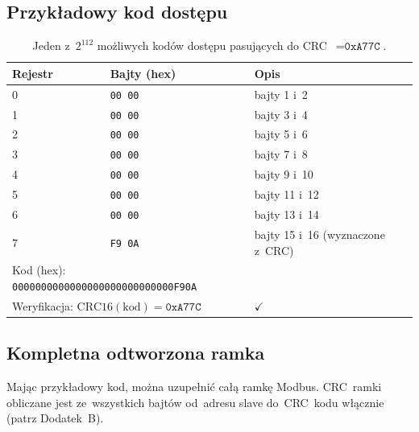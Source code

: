 \documentclass[12pt,a4paper]{article}
\begin{document}
\subsection*{Przykładowy kod dostępu}

\begin{table}[H]
\centering
\begin{tabular}{lll}
\toprule
\textbf{Rejestr} & \textbf{Bajty (hex)} & \textbf{Opis} \\
\midrule
0 & \texttt{00 00} & bajty 1 i~2 \\
1 & \texttt{00 00} & bajty 3 i~4 \\
2 & \texttt{00 00} & bajty 5 i~6 \\
3 & \texttt{00 00} & bajty 7 i~8 \\
4 & \texttt{00 00} & bajty 9 i~10 \\
5 & \texttt{00 00} & bajty 11 i~12 \\
6 & \texttt{00 00} & bajty 13 i~14 \\
7 & \texttt{F9 0A} & bajty 15 i~16 (wyznaczone z~CRC) \\
\midrule
\multicolumn{2}{l}{Kod (hex): \texttt{0000000000000000000000000000F90A}} \\
\multicolumn{2}{l}{Weryfikacja: $\mathrm{CRC16}(\text{kod}) = \texttt{0xA77C}$} & $\checkmark$ \\
\bottomrule
\end{tabular}
\caption{Jeden z~$2^{112}$ możliwych kodów dostępu pasujących do
         CRC~$= \texttt{0xA77C}$.}
\end{table}

\subsection*{Kompletna odtworzona ramka}

Mając przykładowy kod, można uzupełnić całą ramkę Modbus.
CRC~ramki obliczane jest ze~wszystkich bajtów od~adresu slave do~CRC~kodu
włącznie (patrz Dodatek~B).
\end{document}
